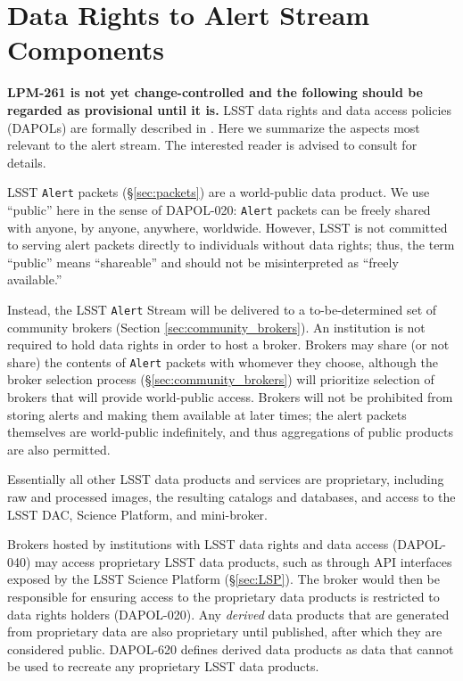 \section{Data Rights to Alert Stream Components}\label{sec:data_rights}

\textbf{LPM-261 is not yet change-controlled and the following should be regarded as provisional until it is.}
LSST data rights and data access policies (DAPOLs) are formally described in . 
Here we summarize the aspects most relevant to the alert stream. 
The interested reader is advised to consult  for details.

LSST {\tt Alert} packets (\S \ref{sec:packets}) are a world-public data product.
We use ``public'' here in the sense of DAPOL-020:  \texttt{Alert} packets can be freely shared with anyone, by anyone, anywhere, worldwide.
However, LSST is not committed to serving alert packets directly to individuals without data rights;
thus, the term ``public'' means ``shareable'' and should not be misinterpreted as ``freely available.''

Instead, the LSST {\tt Alert} Stream will be delivered to a to-be-determined set of community brokers (Section \ref{sec:community_brokers}).
An institution is not required to hold data rights in order to host a broker.
Brokers may share (or not share) the contents of {\tt Alert} packets with whomever they choose,
although the broker selection process (\S \ref{sec:community_brokers}) will prioritize selection of brokers that will provide world-public access.
Brokers will not be prohibited from storing alerts and making them available at later times;
the alert packets themselves are world-public indefinitely, and thus aggregations of public products are also permitted.

Essentially all other LSST data products and services are proprietary, including raw and processed images, the resulting catalogs and databases, and access to the LSST DAC, Science Platform, and mini-broker.

Brokers hosted by institutions with LSST data rights and data access (DAPOL-040) may access proprietary LSST data products, such as through API interfaces exposed by the LSST Science Platform (\S \ref{sec:LSP}).
The broker would then be responsible for ensuring access to the proprietary data products is restricted to data rights holders (DAPOL-020).
Any \textit{derived} data products that are generated from proprietary data are also proprietary until published, after which they are considered public. 
DAPOL-620 defines derived data products as data that cannot be used to recreate any proprietary LSST data products.

